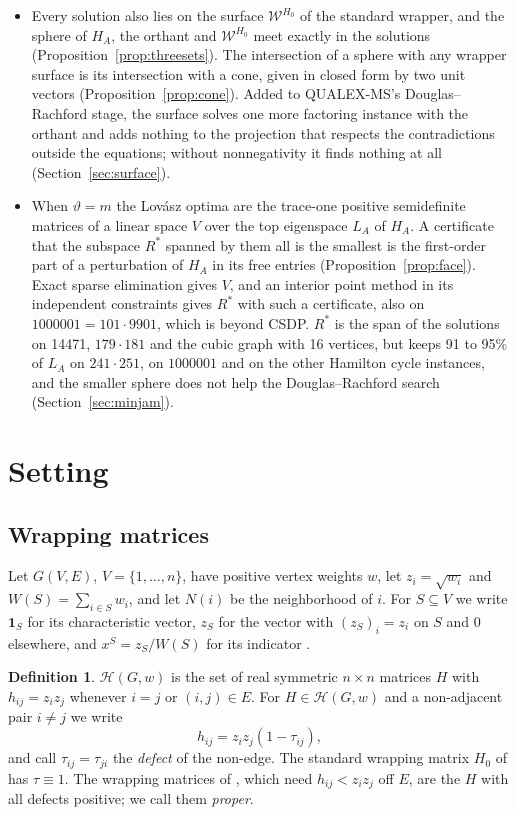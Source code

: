 \documentclass[11pt]{article}
\theoremstyle{definition}
\newtheorem{defn}[thm]{Definition}
\theoremstyle{remark}
\newcommand{\Hc}{\mathcal{H}}
\newcommand{\Wc}{\mathcal{W}}
\newcommand{\one}{\mathbf{1}}
\begin{document}
\begin{itemize}
\item Every solution also lies on the surface $\Wc^{H_0}$ of the standard
wrapper, and the sphere of $H_A$, the orthant and $\Wc^{H_0}$ meet exactly in
the solutions (Proposition~\ref{prop:threesets}). The intersection of a
sphere with any wrapper surface is its intersection with a cone, given in
closed form by two unit vectors (Proposition~\ref{prop:cone}). Added to
QUALEX-MS's Douglas--Rachford stage, the surface solves one more factoring
instance with the orthant and adds nothing to the projection that respects
the contradictions outside the equations; without nonnegativity it finds
nothing at all (Section~\ref{sec:surface}).
\item When $\vartheta=m$ the Lov\'asz optima are the trace-one positive
semidefinite matrices of a linear space $V$ over the top eigenspace $L_A$
of $H_A$. A certificate that the subspace $R^*$ spanned by them all is the
smallest is the first-order part of a perturbation of $H_A$ in its free
entries (Proposition~\ref{prop:face}). Exact sparse elimination gives $V$,
and an interior point method in its independent constraints gives $R^*$
with such a certificate, also on $1000001=101\cdot9901$, which is beyond
CSDP. $R^*$ is the span of the solutions on 14471, $179\cdot181$ and the
cubic graph with 16 vertices, but keeps 91 to 95\% of $L_A$ on
$241\cdot251$, on $1000001$ and on the other Hamilton cycle instances, and
the smaller sphere does not help the Douglas--Rachford search
(Section~\ref{sec:minjam}).
\end{itemize}

\section{Setting}
\label{sec:setting}

\subsection{Wrapping matrices}

Let $G(V,E)$, $V=\{1,\ldots,n\}$, have positive vertex weights $w$, let
$z_i=\sqrt{w_i}$ and $W(S)=\sum_{i\in S} w_i$, and let $N(i)$ be the
neighborhood of $i$. For $S\subseteq V$ we write $\one_S$ for its
characteristic vector, $z_S$ for the vector with $(z_S)_i=z_i$ on $S$ and
$0$ elsewhere, and $x^S=z_S/W(S)$ for its indicator \cite[Definition~1]{CW}.

\begin{defn}
\label{def:family}
$\Hc(G,w)$ is the set of real symmetric $n\times n$ matrices $H$ with
$h_{ij}=z_i z_j$ whenever $i=j$ or $(i,j)\in E$. For $H\in\Hc(G,w)$ and a
non-adjacent pair $i\neq j$ we write
\[ h_{ij} = z_i z_j (1-\tau_{ij}), \]
and call $\tau_{ij}=\tau_{ji}$ the {\em defect} of the non-edge. The
standard wrapping matrix $H_0$ of \cite{CW} has $\tau\equiv 1$. The wrapping
matrices of \cite{CW}, which need $h_{ij}<z_iz_j$ off $E$, are the $H$ with
all defects positive; we call them {\em proper}.
\end{defn}
\end{document}
